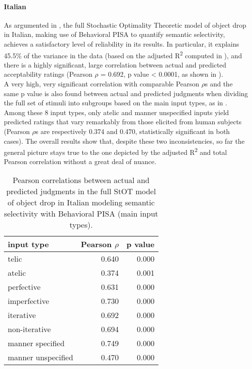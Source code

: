 \paragraph{Italian} 
As argumented in , the full Stochastic Optimality Theoretic model of object drop in Italian, making use of Behavioral PISA to quantify semantic selectivity, achieves a satisfactory level of reliability in its results. In particular, it explains 45.5\% of the variance in the data (based on the adjusted R\textsuperscript{2} computed in ), and there is a highly significant, large correlation between actual and predicted acceptability ratings (Pearson $\rho$ = 0.692, p value < 0.0001, as shown in ).\\
A very high, very significant correlation with comparable Pearson $\rho$s and the same p value is also found between actual and predicted judgments when dividing the full set of stimuli into subgroups based on the main input types, as in . Among these 8 input types, only atelic and manner unspecified inputs yield predicted ratings that vary remarkably from those elicited from human subjects (Pearson $\rho$s are respectively 0.374 and 0.470, statistically significant in both cases). The overall results show that, despite these two inconsistencies, so far the general picture stays true to the one depicted by the adjusted R\textsuperscript{2} and total Pearson correlation without a great deal of nuance.

\begin{table}[htb] %
\caption{Pearson correlations between actual and predicted judgments in the full StOT model of object drop in Italian modeling semantic selectivity with Behavioral PISA (main input types).}
\begin{tabular}{l|rr}
\textbf{input type} & \textbf{Pearson $\rho$} & \textbf{p value} \\
\hline
telic               & 0.640 & 0.000 \\
atelic              & 0.374 & 0.001 \\
perfective          & 0.631 & 0.000 \\
imperfective        & 0.730 & 0.000 \\
iterative           & 0.692 & 0.000 \\
non-iterative       & 0.694 & 0.000 \\
manner specified    & 0.749 & 0.000 \\
manner unspecified  & 0.470 & 0.000
\end{tabular}
\end{table}

